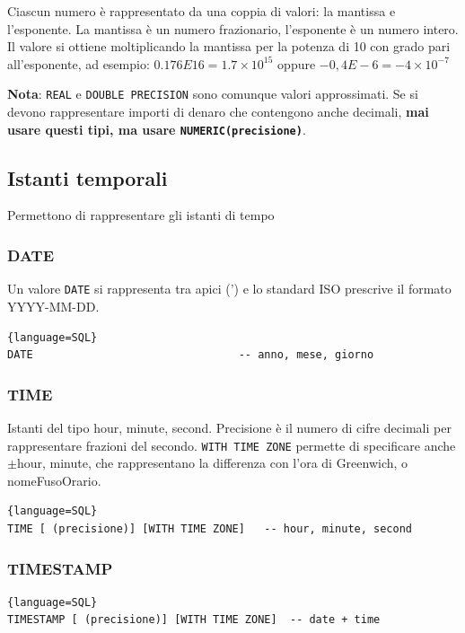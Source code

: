 \documentclass[11pt]{report}
\begin{document}
Ciascun numero \`e rappresentato da una coppia di valori: la mantissa e l'esponente. La mantissa \`e un numero frazionario, l'esponente \`e un numero intero. Il valore si ottiene moltiplicando la mantissa per la potenza di 10 con grado pari all'esponente, ad esempio:
$ 0.176E16 = 1.7 \times 10^{15}$ oppure $-0,4E-6 = -4 \times 10^{-7}$

\textbf{Nota}: \texttt{REAL} e \texttt{DOUBLE PRECISION} sono comunque valori approssimati. Se si devono rappresentare importi di denaro che contengono anche decimali, \textbf{mai usare questi tipi, ma usare \texttt{NUMERIC(precisione)}}.

\subsection{Istanti temporali}

Permettono di rappresentare gli istanti di tempo

\subsubsection{DATE}
Un valore \texttt{DATE} si rappresenta tra apici (') e lo standard ISO prescrive il formato YYYY-MM-DD.
\begin{lstlisting}{language=SQL}
DATE 								-- anno, mese, giorno
\end{lstlisting}

\subsubsection{TIME}
Istanti del tipo hour, minute, second. Precisione \`e il numero di cifre decimali per rappresentare frazioni del secondo.
\texttt{WITH TIME ZONE} permette di specificare anche $\pm$hour, minute, che rappresentano la differenza con l'ora di Greenwich, o nomeFusoOrario.
\begin{lstlisting}{language=SQL}
TIME [ (precisione)] [WITH TIME ZONE]	-- hour, minute, second
\end{lstlisting}

\subsubsection{TIMESTAMP}
\begin{lstlisting}{language=SQL}
TIMESTAMP [ (precisione)] [WITH TIME ZONE]	-- date + time
\end{lstlisting}
\end{document}
